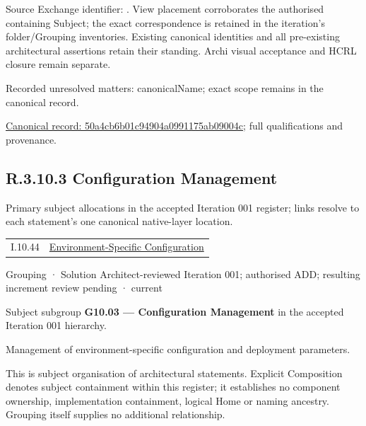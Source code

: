 Source Exchange identifier: \texttt{}. View placement corroborates
the authorised containing Subject; the exact correspondence is retained in the
iteration's folder/Grouping inventories. Existing canonical identities and all
pre-existing architectural assertions retain their standing. Archi visual
acceptance and HCRL closure remain separate.


{\small Recorded unresolved matters: canonicalName; exact scope remains in the canonical record.}\par
{\footnotesize \href{../../../../continuum/grouping/50a4cb6b01c94904a0991175ab09004c.md}{Canonical record: 50a4cb6b01c94904a0991175ab09004c}; full qualifications and provenance.}\par
\subsection*{R.3.10.3 Configuration Management}
\label{navigation:R.3.10.3}

Primary subject allocations in the accepted Iteration 001 register; links resolve to each statement’s one canonical native-layer location.\par
\begin{longtable}{p{.22\linewidth}p{.73\linewidth}}
I.10.44 & \hyperref[element:48e5415eff454e3e9e987506999e62f2]{Environment-Specific Configuration} \\
\end{longtable}
\label{element:ef476f07cd9e4ba6bdac99dc6e940baa}
{\small Grouping · Solution Architect-reviewed Iteration 001; authorised ADD; resulting increment review pending · current}\par

Subject subgroup \textbf{G10.03 — Configuration Management} in the accepted Iteration 001 hierarchy.



Management of environment-specific configuration and deployment parameters.



This is subject organisation of architectural statements. Explicit Composition denotes subject containment within this register; it establishes no component ownership, implementation containment, logical Home or naming ancestry. Grouping itself supplies no additional relationship.



